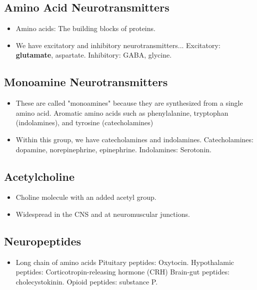 \documentclass[12pt,a4paper]{article}
\begin{document}
	\subsection{Amino Acid Neurotransmitters}
	
	\begin{itemize}
		\item Amino acids: The building blocks of proteins.
		\item We have excitatory and inhibitory neurotransmitters...
		\subitem Excitatory: \textbf{glutamate}, aspartate.
		\subitem Inhibitory: GABA, glycine. 
	\end{itemize}
	
	\subsection{Monoamine Neurotransmitters}
	
	\begin{itemize}
		\item These are called "monoamines" because they are synthesized from a single amino acid. 
		\subitem Aromatic amino acids such as phenylalanine, tryptophan (indolamines), and tyrosine (catecholamines)
		\item Within this group, we have catecholamines and indolamines.
		\subitem Catecholamines: dopamine, norepinephrine, epinephrine. 
		\subitem Indolamines: Serotonin. 
	\end{itemize}
	
	\subsection{Acetylcholine}
	
	\begin{itemize}
		\item Choline molecule with an added acetyl group.
		\item Widespread in the CNS and at neuromuscular junctions. 
	\end{itemize}
	
	\subsection{Neuropeptides}
	
	\begin{itemize}
		\item Long chain of amino acids
		\subitem Pituitary peptides: Oxytocin.
		\subitem Hypothalamic peptides: Corticotropin-releasing hormone (CRH)
		\subitem Brain-gut peptides: cholecystokinin.
		\subitem Opioid peptides: substance P. 
	\end{itemize}
	
\end{document}
